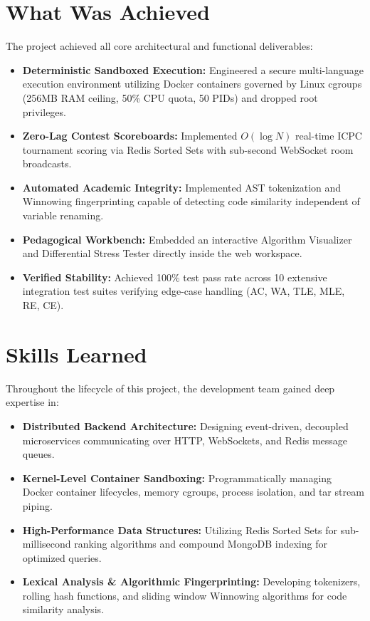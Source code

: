 \documentclass[12pt,a4paper]{report}
\begin{document}
\section{What Was Achieved}
The project achieved all core architectural and functional deliverables:
\begin{itemize}[leftmargin=*]
  \item \textbf{Deterministic Sandboxed Execution:} Engineered a secure multi-language execution environment utilizing Docker containers governed by Linux cgroups (256MB RAM ceiling, 50\% CPU quota, 50 PIDs) and dropped root privileges.
  \item \textbf{Zero-Lag Contest Scoreboards:} Implemented $O(\log N)$ real-time ICPC tournament scoring via Redis Sorted Sets with sub-second WebSocket room broadcasts.
  \item \textbf{Automated Academic Integrity:} Implemented AST tokenization and Winnowing fingerprinting capable of detecting code similarity independent of variable renaming.
  \item \textbf{Pedagogical Workbench:} Embedded an interactive Algorithm Visualizer and Differential Stress Tester directly inside the web workspace.
  \item \textbf{Verified Stability:} Achieved 100\% test pass rate across 10 extensive integration test suites verifying edge-case handling (AC, WA, TLE, MLE, RE, CE).
\end{itemize}

\section{Skills Learned}
Throughout the lifecycle of this project, the development team gained deep expertise in:
\begin{itemize}[leftmargin=*]
  \item \textbf{Distributed Backend Architecture:} Designing event-driven, decoupled microservices communicating over HTTP, WebSockets, and Redis message queues.
  \item \textbf{Kernel-Level Container Sandboxing:} Programmatically managing Docker container lifecycles, memory cgroups, process isolation, and tar stream piping.
  \item \textbf{High-Performance Data Structures:} Utilizing Redis Sorted Sets for sub-millisecond ranking algorithms and compound MongoDB indexing for optimized queries.
  \item \textbf{Lexical Analysis \& Algorithmic Fingerprinting:} Developing tokenizers, rolling hash functions, and sliding window Winnowing algorithms for code similarity analysis.
\end{itemize}
\end{document}
